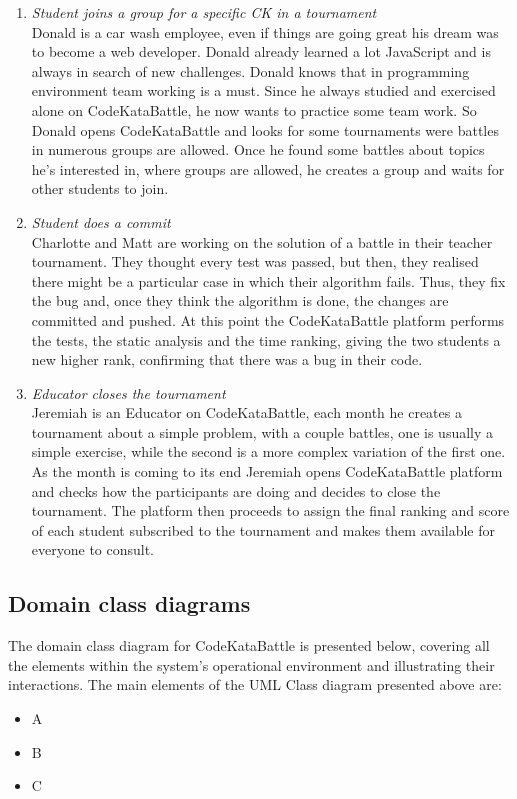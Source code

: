 \documentclass[12pt, a4paper]{report}
\begin{document}
\begin{enumerate}
        \item \textit{Student joins a group for a specific CK in a tournament}\\
            Donald is a car wash employee, even if things are going great his dream was to become a web developer.
            Donald already learned a lot JavaScript and is always in search of new challenges.
            Donald knows that in programming environment team working is a must.
            Since he always studied and exercised alone on CodeKataBattle, he now wants to practice some team work.
            So Donald opens CodeKataBattle and looks for some tournaments were battles in numerous groups are allowed.
            Once he found some battles about topics he's interested in, where groups are allowed, he creates a group and waits for other students to join.
        \item \textit{Student does a commit} \\
            Charlotte and Matt are working on the solution of a battle in their teacher tournament.
            They thought every test was passed, but then, they realised there might be a particular case in which their algorithm fails.
            Thus, they fix the bug and, once they think the algorithm is done, the changes are committed and pushed.
            At this point the CodeKataBattle platform performs the tests, the static analysis and the time ranking, giving the two students a new higher rank, confirming that there was a bug in their code.
        \item \textit{Educator closes the tournament} \\
            Jeremiah is an Educator on CodeKataBattle, each month he creates a tournament about a simple problem, with a couple battles,
            one is usually a simple exercise, while the second is a more complex variation of the first one.
            As the month is coming to its end Jeremiah opens CodeKataBattle platform and checks how the participants are doing and decides to close the tournament.
            The platform then proceeds to assign the final ranking and score of each student subscribed to the tournament and makes them available for everyone to consult. 
    \end{enumerate}

    \subsection{Domain class diagrams}
    The domain class diagram for CodeKataBattle is presented below, covering all the elements within the system's operational environment and illustrating their interactions.
    The main elements of the UML Class diagram presented above are: 
    \begin{itemize}
        \item A
        \item B
        \item C
    \end{itemize}
\end{document}

